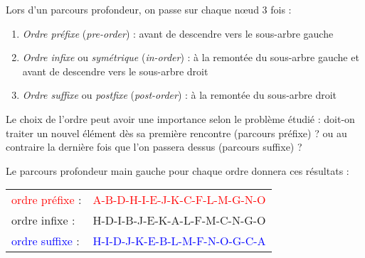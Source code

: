 \documentclass[11pt,a4paper]{article}
\begin{document}
\begin{center}
\end{center}

Lors d'un parcours profondeur, on passe sur chaque nœud 3 fois :

\begin{enumerate}
\item \textit{Ordre préfixe} (\textit{pre-order}) : avant de descendre vers le sous-arbre gauche
\item \textit{Ordre infixe} ou \textit{symétrique} (\textit{in-order}) : à la remontée du sous-arbre gauche et avant de descendre vers le sous-arbre droit
\item \textit{Ordre suffixe} ou \textit{postfixe} (\textit{post-order}) :  à la remontée du sous-arbre droit
\end{enumerate}

Le choix de l'ordre peut avoir une importance selon le problème étudié : doit-on traiter un nouvel élément dès sa première rencontre (parcours préfixe) ? ou au contraire la dernière fois que l'on passera dessus (parcours suffixe) ?

\medskip

Le parcours profondeur main gauche pour chaque ordre donnera ces résultats :

\medskip

\begin{tabular}{l l}
\textcolor{red}{ordre préfixe} : & \textcolor{red}{A-B-D-H-I-E-J-K-C-F-L-M-G-N-O} \\
\textcolor{green(htmlcssgreen)}{ordre infixe} :  & \textcolor{green(htmlcssgreen)}{H-D-I-B-J-E-K-A-L-F-M-C-N-G-O} \\
\textcolor{blue}{ordre suffixe} : & \textcolor{blue}{H-I-D-J-K-E-B-L-M-F-N-O-G-C-A} \\
\end{tabular}
\end{document}
